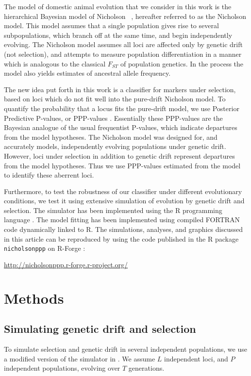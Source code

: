 \documentclass[a4paper,12pt]{article}
\begin{document}
The model of domestic animal evolution that we consider in this work
is the hierarchical Bayesian model of Nicholson \etal\
\cite{nicholson}, hereafter referred to as the Nicholson model. This
model assumes that a single population gives rise to several
subpopulations, which branch off at the same time, and begin
independently evolving. The Nicholson model assumes all loci are
affected only by genetic drift (not selection), and attempts to
measure population differentiation in a manner which is analogous to
the classical $F_{ST}$ of population genetics. In the process the
model also yields estimates of ancestral allele frequency.

The new idea put forth in this work is a classifier for markers under
selection, based on loci which do not fit well into the pure-drift
Nicholson model. To quantify the probability that a locus fits the
pure-drift model, we use Posterior Predictive P-values, or PPP-values
\cite{pppvalues}. Essentially these PPP-values are the Bayesian
analogue of the usual frequentist P-values, which indicate departures
from the model hypotheses. The Nicholson model was designed for, and
accurately models, independently evolving populations under genetic
drift. However, loci under selection in addition to genetic drift
represent departures from the model hypotheses. Thus we use PPP-values
estimated from the model to identify these aberrent loci.

Furthermore, to test the robustness of our classifier under different
evolutionary conditions, we test it using extensive simulation of
evolution by genetic drift and selection. The simulator has been
implemented using the R programming language \cite{R}. The model
fitting has been implemented using compiled FORTRAN code dynamically
linked to R. The simulations, analyses, and graphics discussed in this
article can be reproduced by using the code published in the R package
\texttt{nicholsonppp} on R-Forge \cite{R-Forge}:

 \url{http://nicholsonppp.r-forge.r-project.org/}

\section{Methods}

\subsection{Simulating genetic drift and selection}

To simulate selection and genetic drift in several independent
populations, we use a modified version of the simulator in
\cite{Beaumont-Balding}. We assume $L$ independent loci, and $P$
independent populations, evolving over $T$ generations.
\end{document}
